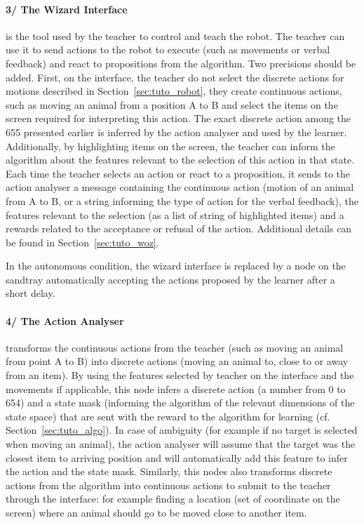 \paragraph{3/ The Wizard Interface} is the tool used by the teacher to control and teach the robot. The teacher can use it to send actions to the robot to execute (such as movements or verbal feedback) and react to propositions from the algorithm. Two precisions should be added. First, on the interface, the teacher do not select the discrete actions for motions described in Section~\ref{sec:tuto_robot}, they create continuous actions, such as moving an animal from a position A to B and select the items on the screen required for interpreting this action. The exact discrete action among the 655 presented earlier is inferred by the action analyser and used by the learner. Additionally, by highlighting items on the screen, the teacher can inform the algorithm about the features relevant to the selection of this action in that state. Each time the teacher selects an action or react to a proposition, it sends to the action analyser a message containing the continuous action (motion of an animal from A to B, or a string informing the type of action for the verbal feedback), the features relevant to the selection (as a list of string of highlighted items) and a rewards related to the acceptance or refusal of the action. Additional details can be found in Section~\ref{sec:tuto_woz}. 

In the autonomous condition, the wizard interface is replaced by a node on the sandtray automatically accepting the actions proposed by the learner after a short delay.

\paragraph{4/ The Action Analyser} transforms the continuous actions from the teacher (such as moving an animal from point A to B) into discrete actions (moving an animal to, close to or away from an item). By using the features selected by teacher on the interface and the movements if applicable, this node infers a discrete action (a number from 0 to 654) and a state mask (informing the algorithm of the relevant dimensions of the state space) that are sent with the reward to the algorithm for learning (cf. Section~\ref{sec:tuto_algo}). In case of ambiguity (for example if no target is selected when moving an animal), the action analyser will assume that the target was the closest item to arriving position and will automatically add this feature to infer the action and the state mask. Similarly, this nodes also transforms discrete actions from the algorithm into continuous actions to submit to the teacher through the interface: for example finding a location (set of coordinate on the screen) where an animal should go to be moved close to another item.


